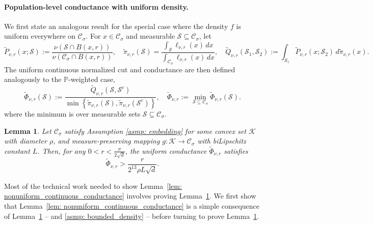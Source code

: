 \documentclass[11pt,twoside]{article}
\newtheorem{lemma}{Lemma}
\newcommand{\set}[1]{\left\{#1\right\}}
\newcommand{\1}{\mathbf{1}}
\newcommand{\Pbb}{\mathbb{P}}
\newcommand{\Sset}{\mathcal{S}}
\newcommand{\Cset}{\mathcal{C}}
\newcommand{\Csig}{\Cset_{\sigma}}
\newcommand{\dx}{\,dx}
\begin{document}
\paragraph{Population-level conductance with uniform density.}
We first state an analogous result for the special case where the density $f$ is uniform everywhere on $\Csig$. For $x \in \Csig$ and measurable $\Sset \subseteq \Csig$, let 
\begin{equation*}
\widetilde{P}_{\nu,r}(x; \Sset) := \frac{\nu(\Sset \cap B(x,r))}{\nu(\Csig \cap B(x,r))}, \quad \widetilde{\pi}_{\nu,r}(\Sset) = \frac{\int_{\Sset} \ell_{\nu,r}(x) \dx}{\int_{\Csig} \ell_{\nu,r}(x) \dx}, \quad  \widetilde{Q}_{\nu,r}(\Sset_1,\Sset_2) := \int_{\Sset_1} \widetilde{P}_{\nu,r}(x;\Sset_2) \,d\widetilde{\pi}_{\nu,r}(x).
\end{equation*}
The uniform continuous normalized cut and conductance are then defined analogously to the $\Pbb$-weighted case,
\begin{equation*}
\widetilde{\Phi}_{\nu,r}(\Sset) := \frac{\widetilde{Q}_{\nu,r}(\Sset, \Sset^c)}{\min\set{\widetilde{\pi}_{\nu,r}(\Sset),\widetilde{\pi}_{\nu,r}(\Sset^c)}}, \quad \widetilde{\Phi}_{\nu,r} := \min_{\Sset \subseteq \Csig} \widetilde{\Phi}_{\nu,r}(\Sset).
\end{equation*}
where the minimum is over measurable sets $\Sset \subseteq \Csig$.

\begin{lemma}
	\label{lem: uniform_continuous_conductance}
	Let $\Csig$ satisfy Assumption \ref{asmp: embedding} for some convex set $\mathcal{K}$ with diameter $\rho$, and measure-preserving mapping $g: \mathcal{K} \to \Csig$ with biLipschitz constant $L$. Then, for any $0 < r < \frac{\sigma}{2\sqrt{d}}$, the uniform conductance $\widetilde{\Phi}_{\nu,r}$ satisfies
	\begin{equation*}
	\widetilde{\Phi}_{\nu,r} > \frac{r}{2^{13} \rho L \sqrt{d}}.
	\end{equation*}
\end{lemma}

Most of the technical work needed to show Lemma~\ref{lem: nonuniform_continuous_conductance} involves proving Lemma~\ref{lem: uniform_continuous_conductance}. We first show that  Lemma~\ref{lem: nonuniform_continuous_conductance} is a simple consequence of Lemma~\ref{lem: uniform_continuous_conductance} -- and \ref{asmp: bounded_density} -- before turning to prove Lemma~\ref{lem: uniform_continuous_conductance}.
\end{document}
